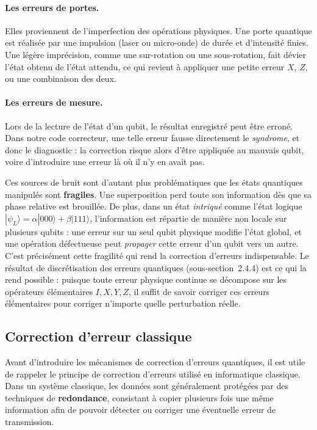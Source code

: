 \documentclass[a4paper,12pt]{article}
\begin{document}
\paragraph{Les erreurs de portes.} Elles proviennent de l'imperfection des
opérations physiques. Une porte quantique est réalisée par une impulsion (laser
ou micro-onde) de durée et d'intensité finies. Une légère imprécision, comme une
sur-rotation ou une sous-rotation, fait dévier l'état obtenu de l'état attendu,
ce qui revient à appliquer une petite erreur $X$, $Z$, ou une combinaison des
deux.

\paragraph{Les erreurs de mesure.} Lors de la lecture de l'état d'un qubit, le
résultat enregistré peut être erroné. Dans notre code correcteur, une telle
erreur fausse directement le \emph{syndrome}, et donc le diagnostic : la
correction risque alors d'être appliquée au mauvais qubit, voire d'introduire
une erreur là où il n'y en avait pas.

\medskip

Ces sources de bruit sont d'autant plus problématiques que les états quantiques
manipulés sont \textbf{fragiles}. Une superposition perd toute son information
dès que sa phase relative est brouillée. De plus, dans un état \emph{intriqué}
comme l'état logique $|\psi_L\rangle = \alpha|000\rangle + \beta|111\rangle$,
l'information est répartie de manière non locale sur plusieurs qubits : une
erreur sur un seul qubit physique modifie l'état global, et une opération
défectueuse peut \emph{propager} cette erreur d'un qubit vers un autre. C'est
précisément cette fragilité qui rend la correction d'erreurs indispensable. Le
résultat de discrétisation des erreurs quantiques (sous-section~2.4.4) est ce
qui la rend possible : puisque toute erreur physique
continue se décompose sur les opérateurs élémentaires $I, X, Y, Z$, il suffit de
savoir corriger ces erreurs élémentaires pour corriger n'importe quelle
perturbation réelle.

\subsection{Correction d'erreur classique}

Avant d’introduire les mécanismes de correction d’erreurs quantiques, il est utile de rappeler le principe de correction d’erreurs utilisé en informatique classique. Dans un système classique, les données sont généralement protégées par des techniques de \textbf{redondance}, consistant à copier plusieurs fois une même information afin de pouvoir détecter ou corriger une éventuelle erreur de transmission.
\end{document}
